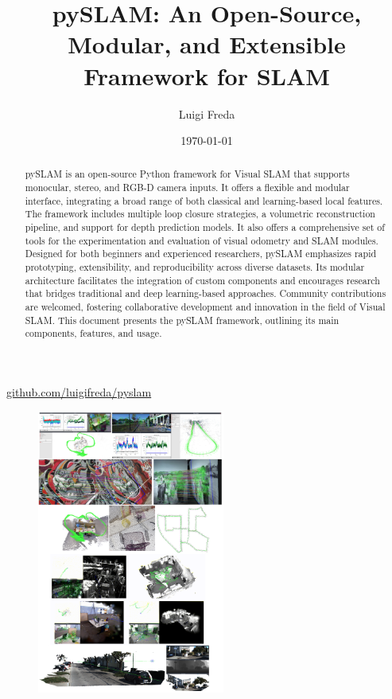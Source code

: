 \documentclass{article}
\title{pySLAM: An Open-Source, Modular, and Extensible Framework for SLAM}
\author{Luigi Freda}
\date{\small \today}  %
\begin{document}
\maketitle
\begin{center}
  \href{https://github.com/luigifreda/pyslam}{github.com/luigifreda/pyslam}
\end{center}

\begin{abstract}
pySLAM is an open-source Python framework for Visual SLAM that supports monocular, stereo, and RGB-D camera inputs. It offers a flexible and modular interface, integrating a broad range of both classical and learning-based local features. The framework includes multiple loop closure strategies, a volumetric reconstruction pipeline, and support for depth prediction models. It also offers a comprehensive set of tools for the experimentation and evaluation of visual odometry and SLAM modules.
Designed for both beginners and experienced researchers, pySLAM emphasizes rapid prototyping, extensibility, and reproducibility across diverse datasets. Its modular architecture facilitates the integration of custom components and encourages research that bridges traditional and deep learning-based approaches. Community contributions are welcomed, fostering collaborative development and innovation in the field of Visual SLAM.
This document presents the pySLAM framework, outlining its main components, features, and usage.
\end{abstract}

\begin{figure}[htbp]
  \centering
  \includegraphics[width=0.55\textwidth]{images_tex/pyslam-teaser-rect.png}
  \label{fig:teaser}
\end{figure}
\end{document}
